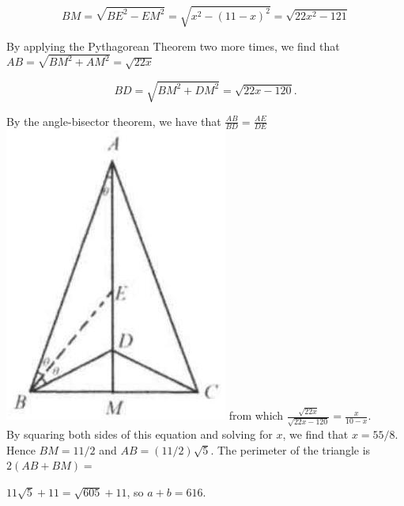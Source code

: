 \documentclass{article}
\begin{document}
\[
B M=\sqrt{B E^{2}-E M^{2}}=\sqrt{x^{2}-(11-x)^{2}}=\sqrt{22 x^{2}-121}
\]

By applying the Pythagorean Theorem two more times, we find that \(A B=\sqrt{B M^{2}+A M^{2}}=\sqrt{22 x}\)

\[
B D=\sqrt{B M^{2}+D M^{2}}=\sqrt{22 x-120} .
\]

By the angle-bisector theorem, we have that \(\frac{A B}{B D}=\frac{A E}{D E}\)\\
\includegraphics[width=\textwidth]{images/reasoning_image_1.jpg} from which \(\frac{\sqrt{22 x}}{\sqrt{22 x-120}}=\frac{x}{10-x}\).\\
By squaring both sides of this equation and solving for \(x\), we find that \(x=55 / 8\). Hence \(B M=11 / 2\) and \(A B=(11 / 2) \sqrt{5}\). The perimeter of the triangle is \(2(A B+B M)=\)


\(11 \sqrt{5}+11=\sqrt{605}+11\), so \(a+b=616\).
\end{document}
